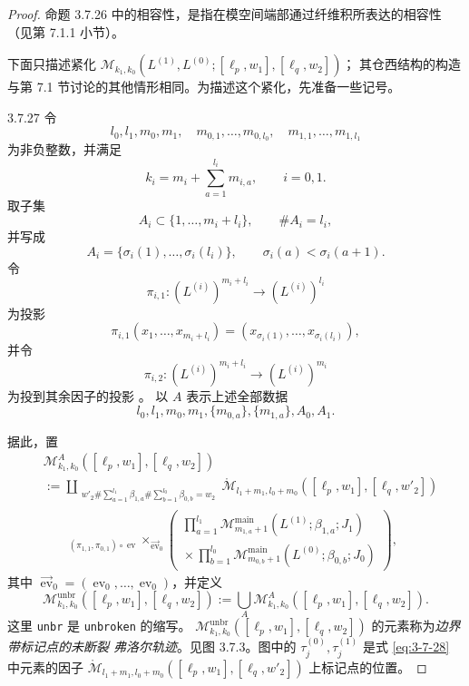\begin{proof}
命题 3.7.26 中的相容性，是指在模空间端部通过纤维积所表达的相容性
（见第 7.1.1 小节）。

下面只描述紧化
$\mathcal M_{k_1,k_0}
(L^{(1)},L^{(0)};[\ell_p,w_1],[\ell_q,w_2])$；
其仓西结构的构造与第 7.1 节讨论的其他情形相同。为描述这个紧化，先准备一些记号。

\begin{definition}{3.7.27}\label{def:3-7-27}
令
\[
 l_0,l_1,m_0,m_1,\quad
 m_{0,1},\ldots,m_{0,l_0},\quad
 m_{1,1},\ldots,m_{1,l_1}
\]
为非负整数，并满足
\[
 k_i=m_i+\sum_{a=1}^{l_i}m_{i,a},\qquad i=0,1.
\]
取子集
\[
 A_i\subset\{1,\ldots,m_i+l_i\},\qquad \#A_i=l_i,
\]
并写成
\[
 A_i=\{\sigma_i(1),\ldots,\sigma_i(l_i)\},
 \qquad \sigma_i(a)<\sigma_i(a+1).
\]
令
\[
 \pi_{i,1}\colon(L^{(i)})^{m_i+l_i}\longrightarrow(L^{(i)})^{l_i}
\]
为投影
\[
 \pi_{i,1}(x_1,\ldots,x_{m_i+l_i})
 =(x_{\sigma_i(1)},\ldots,x_{\sigma_i(l_i)}),
\]
并令
\[
\pi_{i,2}\colon(L^{(i)})^{m_i+l_i}\longrightarrow(L^{(i)})^{m_i}
\]
为投到其余因子的投影
。
以 $A$ 表示上述全部数据
\[
 l_0,l_1,m_0,m_1,\{m_{0,a}\},\{m_{1,a}\},A_0,A_1.
\]
\end{definition}

据此，置
\begin{equation}
\begin{aligned}
&\mathcal M^A_{k_1,k_0}([\ell_p,w_1],[\ell_q,w_2])\\
&:=
\coprod_{\substack{
 w'_2\#\sum_{a=1}^{l_1}\beta_{1,a}
       \#\sum_{b=1}^{l_0}\beta_{0,b}=w_2}}
 \mathring{\mathcal M}_{l_1+m_1,l_0+m_0}
 ([\ell_p,w_1],[\ell_q,w'_2])\\
&\qquad{}_{(\pi_{1,1},\pi_{0,1})\circ\operatorname{ev}}
 \!\times_{\overrightarrow{\operatorname{ev}}_0}
 \left(
 \begin{gathered}
  \prod_{a=1}^{l_1}
  \mathcal M_{m_{1,a}+1}^{\mathrm{main}}
  (L^{(1)};\beta_{1,a};J_1)\\[-0.2em]
  {}\times
  \prod_{b=1}^{l_0}
  \mathcal M_{m_{0,b}+1}^{\mathrm{main}}
  (L^{(0)};\beta_{0,b};J_0)
 \end{gathered}
 \right),
\end{aligned}
\tag{3.7.28}\label{eq:3-7-28}
\end{equation}
其中
$\overrightarrow{\operatorname{ev}}_0
=(\operatorname{ev}_0,\ldots,\operatorname{ev}_0)$，并定义
\begin{equation}
 \mathcal M^{\mathrm{unbr}}_{k_1,k_0}
 ([\ell_p,w_1],[\ell_q,w_2])
 :=
 \bigcup_A
 \mathcal M^A_{k_1,k_0}
 ([\ell_p,w_1],[\ell_q,w_2]).
\tag{3.7.29}\label{eq:3-7-29}
\end{equation}
这里 \texttt{unbr} 是 \texttt{unbroken} 的缩写。
$\mathcal M^{\mathrm{unbr}}_{k_1,k_0}
([\ell_p,w_1],[\ell_q,w_2])$ 的元素称为\emph{边界带标记点的未断裂
弗洛尔轨迹}。见图 3.7.3。图中的
$\tau_j^{(0)},\tau_j^{(1)}$ 是式 \eqref{eq:3-7-28} 中元素的因子
$\mathring{\mathcal M}_{l_1+m_1,l_0+m_0}
([\ell_p,w_1],[\ell_q,w'_2])$ 上标记点的位置。


\end{proof}

